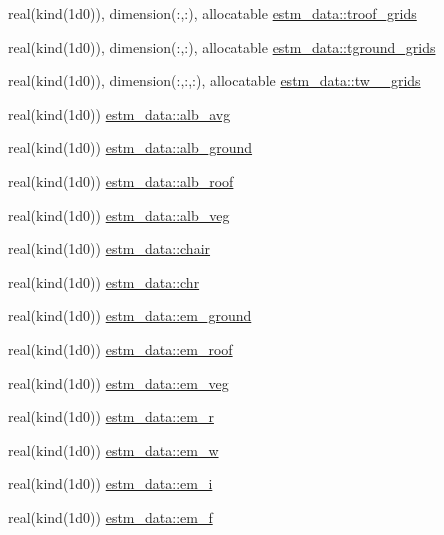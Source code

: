 \begin{DoxyCompactItemize}
real(kind(1d0)), dimension(\+:,\+:), allocatable \hyperlink{namespaceestm__data_aae1edf5139be18aa0eb811a9ccc2985c}{estm\+\_\+data\+::troof\+\_\+grids}
\item 
real(kind(1d0)), dimension(\+:,\+:), allocatable \hyperlink{namespaceestm__data_a2c342d468651c63c5454191631e29c13}{estm\+\_\+data\+::tground\+\_\+grids}
\item 
real(kind(1d0)), dimension(\+:,\+:,\+:), allocatable \hyperlink{namespaceestm__data_a7efa720ab891f65c5700635a46075a0e}{estm\+\_\+data\+::tw\+\_\+\_\+grids}
\item 
real(kind(1d0)) \hyperlink{namespaceestm__data_ae52a19020ba56298fe7780b3ff7b28ff}{estm\+\_\+data\+::alb\+\_\+avg}
\item 
real(kind(1d0)) \hyperlink{namespaceestm__data_a76a61e02b3dd21df95783beee654b5b8}{estm\+\_\+data\+::alb\+\_\+ground}
\item 
real(kind(1d0)) \hyperlink{namespaceestm__data_a3c6b8b304a766dc70d8ca7023dac26ce}{estm\+\_\+data\+::alb\+\_\+roof}
\item 
real(kind(1d0)) \hyperlink{namespaceestm__data_a0c172243ae014ca55f16cdf3fdc0b71e}{estm\+\_\+data\+::alb\+\_\+veg}
\item 
real(kind(1d0)) \hyperlink{namespaceestm__data_aa6d36cc9cf56237cb74ffdce30682dd7}{estm\+\_\+data\+::chair}
\item 
real(kind(1d0)) \hyperlink{namespaceestm__data_a4987b710091708bf51061f8edb66ce63}{estm\+\_\+data\+::chr}
\item 
real(kind(1d0)) \hyperlink{namespaceestm__data_a716c5a370f67397c5e89fdd89af8453d}{estm\+\_\+data\+::em\+\_\+ground}
\item 
real(kind(1d0)) \hyperlink{namespaceestm__data_ae1356a347d79ce36f41977294741499c}{estm\+\_\+data\+::em\+\_\+roof}
\item 
real(kind(1d0)) \hyperlink{namespaceestm__data_acea6bbd39e93113560e4a49945a8aac8}{estm\+\_\+data\+::em\+\_\+veg}
\item 
real(kind(1d0)) \hyperlink{namespaceestm__data_a05f990dc7554e916312b7c01b774956f}{estm\+\_\+data\+::em\+\_\+r}
\item 
real(kind(1d0)) \hyperlink{namespaceestm__data_a603b2198df6b2c26f5aabbec5b04ef72}{estm\+\_\+data\+::em\+\_\+w}
\item 
real(kind(1d0)) \hyperlink{namespaceestm__data_a8fd7327f01717b62ccea848081385634}{estm\+\_\+data\+::em\+\_\+i}
\item 
real(kind(1d0)) \hyperlink{namespaceestm__data_ab7d39c4c162023ce9dbe29351fc13f7c}{estm\+\_\+data\+::em\+\_\+f}

\end{DoxyCompactItemize}
